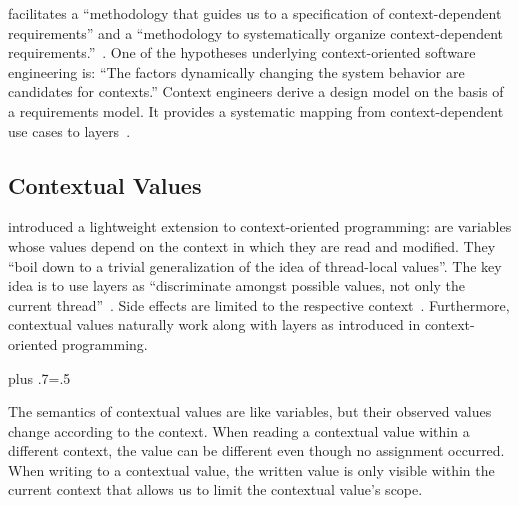  facilitates a \enquote{methodology that guides us to a specification of context-dependent requirements} and a \enquote{methodology to systematically organize context-dependent requirements.}~\cite{kamina2014context}.
One of the hypotheses underlying context-oriented software engineering is: \enquote{The factors dynamically changing the system behavior are candidates for contexts.}
Context engineers derive a design model on the basis of a requirements model.
It provides a systematic mapping from context-dependent use cases to layers~\cite{kamina2014context}.


\subsection{Contextual Values}


\citet{tanter2008contextvalues} introduced a lightweight extension to context-oriented programming:
 are variables whose values depend on the context in which they are read and modified.
They \enquote{boil down to a trivial generalization of the idea of thread-local values}.
The key idea is to use layers as \enquote{discriminate amongst possible values, not only the current thread}~\cite{tanter2008contextvalues}.
Side effects are limited to the respective context~\cite{raab2016unanticipated}.
Furthermore, contextual values naturally work along with layers as introduced in context-oriented programming.%
{\parfillskip=0pt plus .7\textwidth \emergencystretch=.5\textwidth \par}

The semantics of contextual values are like variables, but their observed values change according to the context.
When reading a contextual value within a different context, the value can be different even though no assignment occurred.
When writing to a contextual value, the written value is only visible within the current context that allows us to limit the contextual value's scope.
